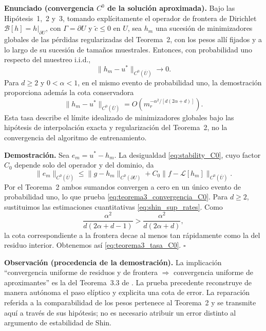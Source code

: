 \noindent\textbf{Enunciado (convergencia $C^0$ de la solución aproximada).}
Bajo las Hipótesis~1,~2 y~3, tomando explícitamente el operador
de frontera de Dirichlet $\mathcal B[h]=h|_{\partial U}$, con
$\Gamma=\partial U$ y $\widetilde c\le0$ en $U$, sea $h_m$ una sucesión de minimizadores
globales de las pérdidas regularizadas del Teorema~2, con los pesos allí
fijados y a lo largo de su sucesión de tamaños muestrales. Entonces,
con probabilidad uno respecto del muestreo i.i.d.,
\begin{equation}\label{eq:teorema3_convergencia_C0}
\|h_m-u^*\|_{C^0(\overline U)}\longrightarrow0.
\end{equation}
Para $d\ge2$ y $0<\alpha<1$, en el mismo evento de probabilidad uno,
la demostración proporciona además la cota conservadora
\begin{equation}\label{eq:teorema3_tasa_C0}
\|h_m-u^*\|_{C^0(\overline U)}
=O\!\left(m_r^{-\alpha^2/[d(2\alpha+d)]}\right).
\end{equation}
Esta tasa describe el límite idealizado de minimizadores globales bajo
las hipótesis de interpolación exacta y regularización del Teorema~2,
no la convergencia del algoritmo de entrenamiento.

\medskip
\noindent\textbf{Demostración.}
Sea $e_m=u^*-h_m$. La desigualdad \eqref{eq:stability_C0}, cuyo
factor $C_0$ depende solo del operador y del dominio, da
\[
\|e_m\|_{C^0(\overline U)}
\le
\|g-h_m\|_{C^0(\partial U)}+
C_0\|f-\mathcal L[h_m]\|_{C^0(\overline U)}.
\]
Por el Teorema~2 ambos sumandos convergen a cero en un único evento
de probabilidad uno, lo que prueba \eqref{eq:teorema3_convergencia_C0}.
Para $d\ge2$, sustituimos las estimaciones cuantitativas
\eqref{eq:shin_sup_rates}. Como
\[
\frac{\alpha^2}{d(2\alpha+d-1)}>
\frac{\alpha^2}{d(2\alpha+d)},
\]
la cota correspondiente a la frontera decae al menos tan rápidamente
como la del residuo interior. Obtenemos así
\eqref{eq:teorema3_tasa_C0}.
\hfill$\square$

\medskip
\noindent\textbf{Observación (procedencia de la demostración).}
La implicación ``convergencia uniforme de residuos y de frontera $\Rightarrow$
convergencia uniforme de aproximantes'' es la del Teorema~3.3 de
\cite{shin2020convergence}. La prueba precedente reconstruye de manera
autónoma el paso elíptico y explicita una cota de error. La reparación
referida a la comparabilidad de los pesos pertenece al Teorema~2 y se
transmite aquí a través de sus hipótesis; no es necesario atribuir un
error distinto al argumento de estabilidad de Shin.

